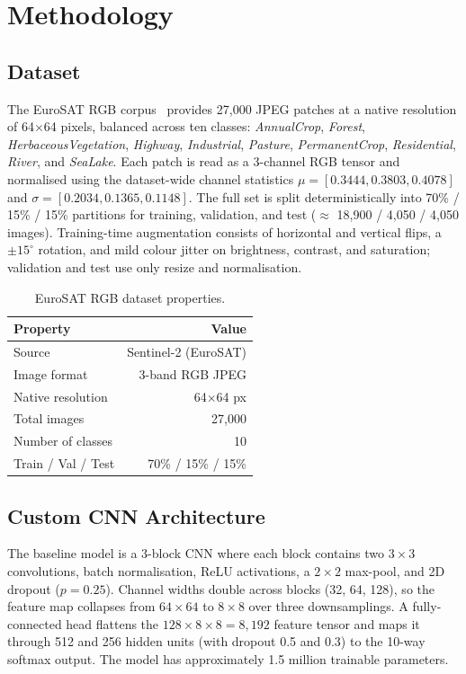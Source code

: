 \documentclass[conference]{IEEEtran}
\begin{document}
\section{Methodology}
\label{sec:method}

\subsection{Dataset}

The EuroSAT RGB corpus~\cite{helber2019eurosat} provides 27{,}000
JPEG patches at a native resolution of 64$\times$64 pixels, balanced
across ten classes: \emph{AnnualCrop}, \emph{Forest},
\emph{HerbaceousVegetation}, \emph{Highway}, \emph{Industrial},
\emph{Pasture}, \emph{PermanentCrop}, \emph{Residential}, \emph{River},
and \emph{SeaLake}. Each patch is read as a 3-channel RGB tensor and
normalised using the dataset-wide channel statistics
$\mu=[0.3444, 0.3803, 0.4078]$ and
$\sigma=[0.2034, 0.1365, 0.1148]$. The full set is split deterministically
into 70\% / 15\% / 15\% partitions for training, validation, and test
($\approx$ 18{,}900 / 4{,}050 / 4{,}050 images). Training-time
augmentation consists of horizontal and vertical flips, a $\pm 15^{\circ}$
rotation, and mild colour jitter on brightness, contrast, and
saturation; validation and test use only resize and normalisation.

\begin{table}[t]
\caption{EuroSAT RGB dataset properties.}
\label{tab:dataset}
\centering
\begin{tabular}{lr}
\toprule
Property & Value \\
\midrule
Source & Sentinel-2 (EuroSAT) \\
Image format & 3-band RGB JPEG \\
Native resolution & 64$\times$64 px \\
Total images & 27{,}000 \\
Number of classes & 10 \\
Train / Val / Test & 70\% / 15\% / 15\% \\
\bottomrule
\end{tabular}
\end{table}

\subsection{Custom CNN Architecture}

The baseline model is a 3-block CNN where each block contains two
$3\times3$ convolutions, batch normalisation, ReLU activations, a
$2\times2$ max-pool, and 2D dropout ($p=0.25$). Channel widths
double across blocks (32, 64, 128), so the feature map collapses from
$64\times64$ to $8\times8$ over three downsamplings. A
fully-connected head flattens the $128\times8\times8=8{,}192$
feature tensor and maps it through 512 and 256 hidden units (with
dropout 0.5 and 0.3) to the 10-way softmax output. The model has
approximately 1.5 million trainable parameters.
\end{document}
